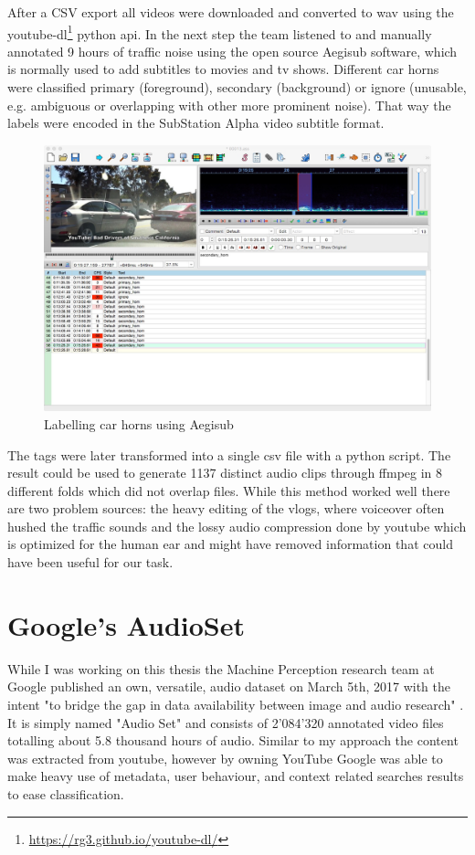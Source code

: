 After a CSV export all videos were downloaded and converted to wav using the youtube-dl\footnote{\url{https://rg3.github.io/youtube-dl/}} python api. In the next step the team listened to and manually annotated 9 hours of traffic noise using the open source Aegisub software, which is normally used to add subtitles to movies and tv shows. Different car horns were classified primary (foreground), secondary (background) or ignore (unusable, e.g. ambiguous or overlapping with other more prominent noise). That way the labels were encoded in the SubStation Alpha video subtitle format.


\begin{figure}[h]
    \centering
	\includegraphics[width=.85\textwidth]{./images/illustrations/subt}
    \caption{Labelling car horns using Aegisub}
    \label{fig:subt}
\end{figure}



 The tags were later transformed into a single csv file with a python script. The result could be used to generate 1137 distinct audio clips through ffmpeg in 8 different folds which did not overlap files. While this method worked well there are two problem sources: the heavy editing of the vlogs, where voiceover often hushed the traffic sounds and the lossy audio compression done by youtube which is optimized for the human ear and might have removed information that could have been useful for our task.


\section{Google's AudioSet}

While I was working on this thesis the Machine Perception research team at Google published an own, versatile, audio dataset on March 5th, 2017 with the intent "to bridge the gap in data availability between image and audio research" \cite{45857}. It is simply named "Audio Set" and consists of 2'084'320 annotated video files totalling about 5.8 thousand hours of audio. Similar to my approach the content was extracted from youtube, however by owning YouTube Google was able to make heavy use of metadata, user behaviour, and context related searches results to ease classification.


